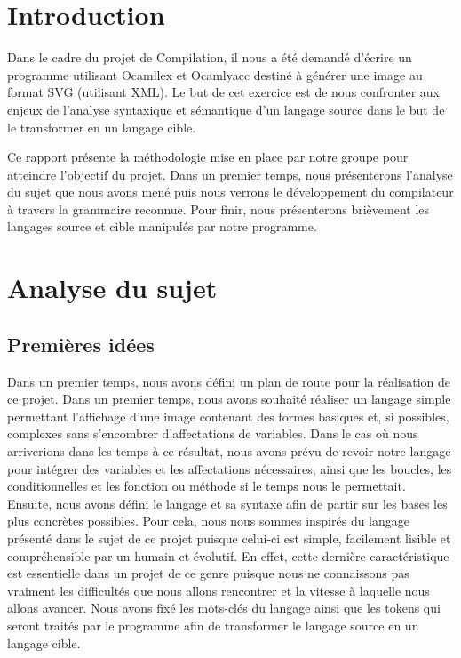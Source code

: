 
\chapter*{Introduction}
	Dans le cadre du projet de Compilation, il nous a été demandé d'écrire un programme utilisant Ocamllex et Ocamlyacc destiné à générer une image au format SVG (utilisant XML). Le but de cet exercice est de nous confronter aux enjeux de l'analyse syntaxique et sémantique d'un langage source dans le but de le transformer en un langage cible.
	
	Ce rapport présente la méthodologie mise en place par notre groupe pour atteindre l'objectif du projet. Dans un premier temps, nous présenterons l'analyse du sujet que nous avons mené puis nous verrons le développement du compilateur à travers la grammaire reconnue. Pour finir, nous présenterons brièvement les langages source et cible manipulés par notre programme.

\chapter{Analyse du sujet}

	\section{Premières idées}
		Dans un premier temps, nous avons défini un plan de route pour la réalisation de ce projet. Dans un premier temps, nous avons souhaité réaliser un langage simple permettant l'affichage d'une image contenant des formes basiques et, si possibles, complexes sans s'encombrer d'affectations de variables. Dans le cas où nous arriverions dans les temps à ce résultat, nous avons prévu de revoir notre langage pour intégrer des variables et les affectations nécessaires, ainsi que les boucles, les conditionnelles et les fonction ou méthode si le temps nous le permettait. \\
		
		Ensuite, nous avons défini le langage et sa syntaxe afin de partir sur les bases les plus concrètes possibles. Pour cela, nous nous sommes inspirés du langage présenté dans le sujet de ce projet puisque celui-ci est simple, facilement lisible et compréhensible par un humain et évolutif. En effet, cette dernière caractéristique est essentielle dans un projet de ce genre puisque nous ne connaissons pas vraiment les difficultés que nous allons rencontrer et la vitesse à laquelle nous allons avancer. Nous avons fixé les mots-clés du langage ainsi que les tokens qui seront traités par le programme afin de transformer le langage source en un langage cible.
	
